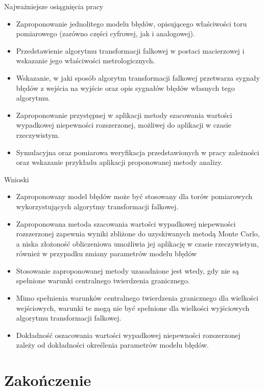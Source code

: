 \documentclass[12pt, polish, aspectratio = 169]{slides}
\begin{document}

\begin{frame}{Najważniejsze osiągnięcia pracy}
\begin{itemize}
\item Zaproponowanie jednolitego modelu błędów, opisującego właściwości toru pomiarowego (zarówno części cyfrowej, jak i analogowej).
\item Przedstawienie algorytmu transformacji falkowej w postaci macierzowej i wskazanie jego właściwości metrologicznych.
\item Wskazanie, w jaki sposób algorytm transformacji falkowej przetwarza sygnały błędów z wejścia na wyjście oraz opis sygnałów błędów własnych tego algorytmu.
\item Zaproponowanie przystępnej w aplikacji metody szacowania wartości wypadkowej niepewności rozszerzonej, możliwej do aplikacji w czasie rzeczywistym.
\item Symulacyjna oraz pomiarowa weryfikacja przedstawionych w pracy zależności oraz wskazanie przykładu aplikacji proponowanej metody analizy.
\end{itemize}
\end{frame}

\begin{frame}{Wnioski}
\begin{itemize}
\item Zaproponowany model błędów może być stosowany dla torów pomiarowych wykorzystujących algorytmy transformacji falkowej.
\item Zaproponowana metoda szacowania wartości wypadkowej niepewności rozszerzonej zapewnia wyniki zbliżone do uzyskiwanych metodą Monte Carlo, a niska złożoność obliczeniowa umożliwia jej aplikację w czasie rzeczywistym, również w przypadku zmiany parametrów modelu błędów
\item Stosowanie zaproponowanej metody uzasadnione jest wtedy, gdy nie są spełnione warunki centralnego twierdzenia granicznego.
\item Mimo spełnienia warunków centralnego twierdzenia granicznego dla wielkości wejściowych, warunki te mogą nie być spełnione dla wielkości wyjściowych algorytmu transformacji falkowej.
\item Dokładność oszacowania wartości wypadkowej niepewności rozszerzonej zależy od dokładności określenia parametrów modelu błędów.
\end{itemize}
\end{frame}

\section*{Zakończenie}

\begin{frame}[plain]
\lastpage
\end{frame}
\end{document}

